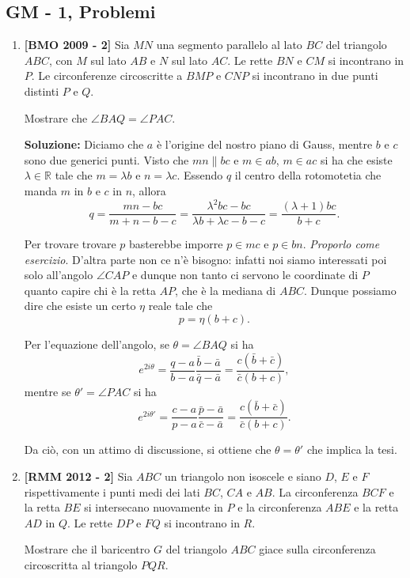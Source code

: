 \subsection{GM - 1, Problemi}
\begin{enumerate}
	\item \textbf{[BMO 2009 - 2]} Sia $MN$ una segmento parallelo al lato $BC$ del triangolo $ABC$, con $M$ sul lato $AB$ e $N$ sul lato $AC$. Le rette $BN$ e $CM$ si incontrano in $P$. Le circonferenze circoscritte a $BMP$ e $CNP$ si incontrano in due punti distinti $P$ e $Q$. 
	
	Mostrare che $\angle BAQ = \angle PAC$.
	
	\textbf{Soluzione:} Diciamo che $a$ è l'origine del nostro piano di Gauss, mentre $b$ e $c$ sono due generici punti. Visto che $mn\parallel bc$ e $m\in ab$, $m\in ac$ si ha che esiste $\lambda \in \mathbb R$ tale che $m=\lambda b$ e $n=\lambda c$. Essendo $q$ il centro della rotomotetia che manda $m$ in $b$ e $c$ in $n$, allora 
	$$
	q=\frac{mn-bc}{m+n-b-c}=\frac{\lambda^2bc-bc}{\lambda b+\lambda c-b-c}=\frac{(\lambda+1)bc}{b+c}.
	$$
	
	Per trovare trovare $p$ basterebbe imporre $p\in mc$ e $p\in bn$. \emph{Proporlo come esercizio}. D'altra parte non ce n'è bisogno: infatti noi siamo interessati poi solo all'angolo $\angle CAP$ e dunque non tanto ci servono le coordinate di $P$ quanto capire chi è la retta $AP$, che è la mediana di $ABC$. Dunque possiamo dire che esiste un certo $\eta$ reale tale che 
	$$
	p=\eta(b+c).
	$$ 
	
	Per l'equazione dell'angolo, se $\theta=\angle BAQ$ si ha 
	$$
	e^{2i\theta}=\frac{q-a}{b-a}\frac{\bar b-\bar a}{\bar q-\bar a}=\frac{c(\bar b+\bar c)}{\bar c(b+c)},
	$$
	mentre se $\theta'=\angle PAC$ si ha 
	$$
	e^{2i\theta'}=\frac{c-a}{p-a}\frac{\bar p-\bar a}{\bar c-\bar a}=\frac{c(\bar b+\bar c)}{\bar c(b+c)}.
	$$
	
	Da ciò, con un attimo di discussione, si ottiene che $\theta=\theta'$ che implica la tesi. 
	
	\item \textbf{[RMM 2012 - 2]} Sia $ABC$ un triangolo non isoscele e siano $D$, $E$ e $F$ rispettivamente i punti medi dei lati $BC$, $CA$ e $AB$. La circonferenza $BCF$ e la retta $BE$ si intersecano nuovamente in $P$ e la circonferenza $ABE$ e la retta $AD$ in $Q$. Le rette $DP$ e $FQ$ si incontrano in $R$. 
	
	Mostrare che il baricentro $G$ del triangolo $ABC$ giace sulla circonferenza circoscritta al triangolo $PQR$.
	

\end{enumerate}
